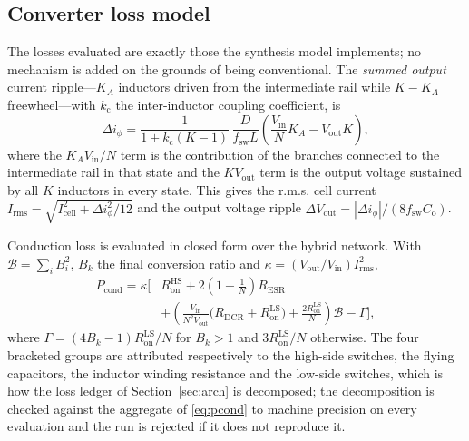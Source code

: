 \documentclass[journal]{IEEEtran}
\begin{document}
\subsection{Converter loss model}
The losses evaluated are exactly those the synthesis model implements; no mechanism is added
on the grounds of being conventional. The \emph{summed output} current ripple---$K_{A}$
inductors driven from the intermediate rail while $K-K_{A}$ freewheel---with
$k_{\mathrm{c}}$ the inter-inductor coupling coefficient, is
\begin{equation}
\Delta i_{\phi} = \frac{1}{1+k_{\mathrm{c}}(K-1)}\,
\frac{D}{f_{\mathrm{sw}} L}\left(\frac{V_{\mathrm{in}}}{N}K_{A} - V_{\mathrm{out}}K\right),
\label{eq:ripple}
\end{equation}
where the $K_{A}V_{\mathrm{in}}/N$ term is the contribution of the branches connected to the
intermediate rail in that state and the $KV_{\mathrm{out}}$ term is the output voltage
sustained by all $K$ inductors in every state. This gives the r.m.s. cell current
$I_{\mathrm{rms}} = \sqrt{I_{\mathrm{cell}}^{2} + \Delta i_{\phi}^{2}/12}$ and the output
voltage ripple $\Delta V_{\mathrm{out}} = |\Delta i_{\phi}|/(8 f_{\mathrm{sw}} C_{\mathrm{o}})$.

Conduction loss is evaluated in closed form over the hybrid network. With
$\mathcal{B} = \sum_{i} B_{i}^{2}$, $B_{k}$ the final conversion ratio and
$\kappa = (V_{\mathrm{out}}/V_{\mathrm{in}})I_{\mathrm{rms}}^{2}$,
\begin{equation}
\begin{aligned}
P_{\mathrm{cond}} = \kappa \Bigg[ &R_{\mathrm{on}}^{\mathrm{HS}}
 + 2\!\left(1-\tfrac{1}{N}\right)\!R_{\mathrm{ESR}} \\
 &+ \left(\frac{V_{\mathrm{in}}}{N^{2}V_{\mathrm{out}}}
   \big(R_{\mathrm{DCR}} + R_{\mathrm{on}}^{\mathrm{LS}}\big)
   + \frac{2R_{\mathrm{on}}^{\mathrm{LS}}}{N}\right)\!\mathcal{B}
 - \Gamma \Bigg],
\end{aligned}
\label{eq:pcond}
\end{equation}
where $\Gamma = (4B_{k}-1)R_{\mathrm{on}}^{\mathrm{LS}}/N$ for $B_{k}>1$ and
$3R_{\mathrm{on}}^{\mathrm{LS}}/N$ otherwise. The four bracketed groups are attributed
respectively to the high-side switches, the flying capacitors, the inductor winding
resistance and the low-side switches, which is how the loss ledger of
Section~\ref{sec:arch} is decomposed; the decomposition is checked against the aggregate of
\eqref{eq:pcond} to machine precision on every evaluation and the run is rejected if it does
not reproduce it.
\end{document}
